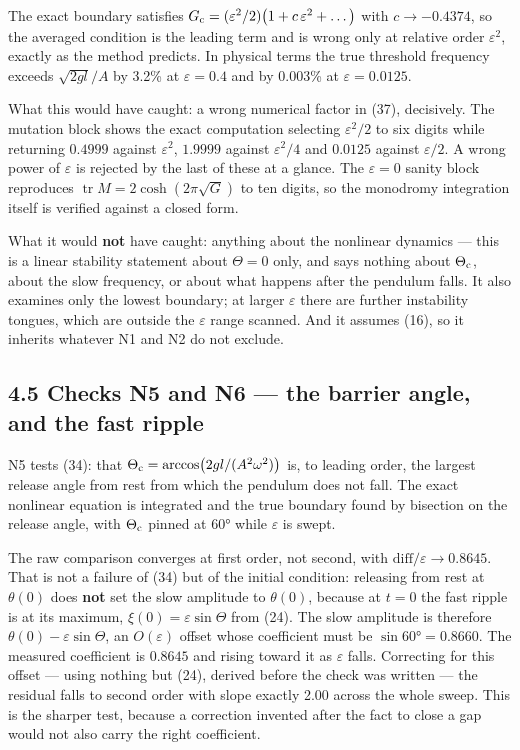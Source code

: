 \documentclass[11pt,a4paper]{article}
\newcommand{\tagmark}[1]{\marginnote{\scriptsize\ttfamily #1}}
\newcommand{\Ntag}{\tagmark{[N]}}   %
\begin{document}
The exact boundary satisfies
\(G_{\rm c}=(\varepsilon^2/2)\bigl(1+c\,\varepsilon^2+\dots\bigr)\) with
\(c\to-0.4374\), so the averaged condition is the leading term and is wrong only
at relative order \(\varepsilon^2\), exactly as the method predicts. In physical
terms the true threshold frequency exceeds \(\sqrt{2gl}/A\) by 3.2\% at
\(\varepsilon=0.4\) and by 0.003\% at \(\varepsilon=0.0125\).

What this would have caught: a wrong numerical factor in (37), decisively. The
mutation block shows the exact computation selecting \(\varepsilon^2/2\) to six
digits while returning \(0.4999\) against \(\varepsilon^2\), \(1.9999\) against
\(\varepsilon^2/4\) and \(0.0125\) against \(\varepsilon/2\). A wrong power of
\(\varepsilon\) is rejected by the last of these at a glance. The \(\varepsilon=0\)
sanity block reproduces \(\operatorname{tr}M=2\cosh(2\pi\sqrt G)\) to ten digits,
so the monodromy integration itself is verified against a closed form.

What it would \textbf{not} have caught: anything about the nonlinear dynamics --- this
is a linear stability statement about \(\Theta=0\) only, and says nothing about
\(\Theta_{\rm c}\), about the slow frequency, or about what happens after the
pendulum falls. It also examines only the lowest boundary; at larger
\(\varepsilon\) there are further instability tongues, which are outside the
\(\varepsilon\) range scanned. And it assumes (16), so it inherits whatever N1 and
N2 do not exclude.

\hypertarget{checks-n5-and-n6-the-barrier-angle-and-the-fast-ripple}{%
\subsection{4.5 Checks N5 and N6 --- the barrier angle, and the fast ripple}\label{checks-n5-and-n6-the-barrier-angle-and-the-fast-ripple}}

\Ntag{} N5 tests (34): that \(\Theta_{\rm c}=\arccos\bigl(2gl/(A^2\omega^2)\bigr)\)
is, to leading order, the largest release angle from rest from which the
pendulum does not fall. The exact nonlinear equation is integrated and the true
boundary found by bisection on the release angle, with \(\Theta_{\rm c}\) pinned
at 60° while \(\varepsilon\) is swept.

The raw comparison converges at first order, not second, with
\(\text{diff}/\varepsilon\to0.8645\). That is not a failure of (34) but of the
initial condition: releasing from rest at \(\theta(0)\) does \textbf{not} set the slow
amplitude to \(\theta(0)\), because at \(t=0\) the fast ripple is at its maximum,
\(\xi(0)=\varepsilon\sin\Theta\) from (24). The slow amplitude is therefore
\(\theta(0)-\varepsilon\sin\Theta\), an \(O(\varepsilon)\) offset whose coefficient
must be \(\sin60°=0.8660\). The measured coefficient is \(0.8645\) and rising toward
it as \(\varepsilon\) falls. Correcting for this offset --- using nothing but (24),
derived before the check was written --- the residual falls to second order with
slope exactly 2.00 across the whole sweep. This is the sharper test, because a
correction invented after the fact to close a gap would not also carry the right
coefficient.
\end{document}
